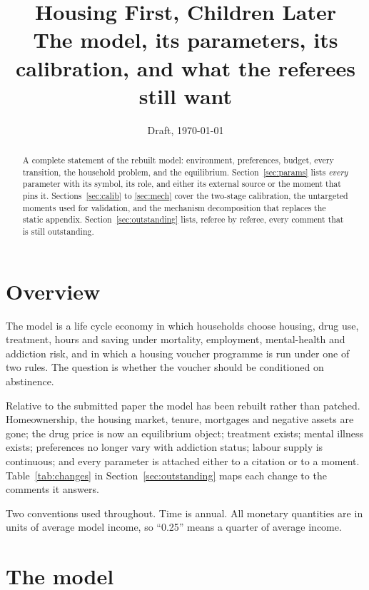 \documentclass[11pt]{article}
\title{\textbf{Housing First, Children Later}\\[0.4em]
\large The model, its parameters, its calibration, and what the referees still want}
\author{}
\date{Draft, \today}
\begin{document}
\maketitle

\begin{abstract}
\noindent A complete statement of the rebuilt model: environment, preferences,
budget, every transition, the household problem, and the equilibrium.
Section~\ref{sec:params} lists \emph{every} parameter with its symbol, its role,
and either its external source or the moment that pins it.
Sections~\ref{sec:calib} to \ref{sec:mech} cover the two-stage calibration, the
untargeted moments used for validation, and the mechanism decomposition that
replaces the static appendix. Section~\ref{sec:outstanding} lists, referee by
referee, every comment that is still outstanding.
\end{abstract}

\newpage

\section{Overview}

The model is a life cycle economy in which households choose housing, drug use,
treatment, hours and saving under mortality, employment, mental-health and
addiction risk, and in which a housing voucher programme is run under one of two
rules. The question is whether the voucher should be conditioned on abstinence.

Relative to the submitted paper the model has been rebuilt rather than patched.
Homeownership, the housing market, tenure, mortgages and negative assets are
gone; the drug price is now an equilibrium object; treatment exists; mental
illness exists; preferences no longer vary with addiction status; labour supply
is continuous; and every parameter is attached either to a citation or to a
moment. Table~\ref{tab:changes} in Section~\ref{sec:outstanding} maps each change
to the comments it answers.

Two conventions used throughout. Time is annual. All monetary quantities are in
units of average model income, so ``0.25'' means a quarter of average income.

\section{The model}
\end{document}
